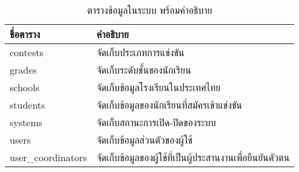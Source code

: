 \begin{table}[htbp]
    \caption{ตารางข้อมูลในระบบ พร้อมคำอธิบาย}
    \label{tab:database}
    \begin{tabularx}{\textwidth}{ | p{3cm} | X | }
    \hline
    \textbf{ชื่อตาราง} & \textbf{คำอธิบาย} \\
    \hline
    contests & จัดเก็บประเภทการแข่งขัน \\
    \hline
    grades & จัดเก็บระดับชั้นของนักเรียน \\
    \hline
    schools & จัดเก็บข้อมูลโรงเรียนในประเทศไทย \\
    \hline
    students & จัดเก็บข้อมูลของนักเรียนที่สมัครเข้าแข่งขัน \\
    \hline
    systems & จัดเก็บสถานะการเปิด-ปิดของระบบ \\
    \hline
    users & จัดเก็บข้อมูลส่วนตัวของผู้ใช้ \\
    \hline
    user\_coordinators & จัดเก็บข้อมูลของผู้ใช้ที่เป็นผู้ประสานงานเพื่อยืนยันตัวตน \\
    \hline
    \end{tabularx}
\end{table}
    
